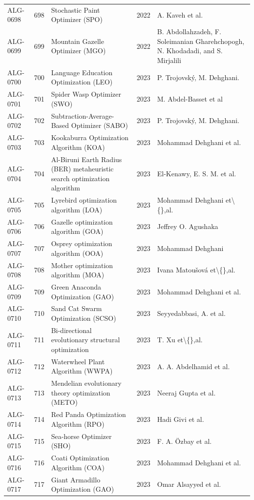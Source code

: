 \documentclass[8pt]{article}
\begin{document}
\begin{landscape}
\begin{longtable}{P{1.7cm}rP{10.0cm}rP{7.2cm}}
ALG-0698 & 698 & Stochastic Paint Optimizer (SPO) & 2022 & A. Kaveh et al. \\
ALG-0699 & 699 & Mountain Gazelle Optimizer (MGO) & 2022 & B. Abdollahzadeh, F. Soleimanian Gharehchopogh, N. Khodadadi, and S. Mirjalili \\
ALG-0700 & 700 & Language Education Optimization (LEO) & 2023 & P. Trojovský, M. Dehghani. \\
ALG-0701 & 701 & Spider Wasp Optimizer (SWO) & 2023 & M. Abdel-Basset et al \\
ALG-0702 & 702 & Subtraction-Average-Based Optimizer (SABO) & 2023 & P. Trojovský, M. Dehghani. \\
ALG-0703 & 703 & Kookaburra Optimization Algorithm (KOA) & 2023 & Mohammad Dehghani et al. \\
ALG-0704 & 704 & Al-Biruni Earth Radius (BER) metaheuristic search optimization algorithm & 2023 & El-Kenawy, E. S. M. et al. \\
ALG-0705 & 705 & Lyrebird optimization algorithm (LOA) & 2023 & Mohammad Dehghani et\textbackslash\{\},al. \\
ALG-0706 & 706 & Gazelle optimization algorithm (GOA) & 2023 & Jeffrey O. Agushaka \\
ALG-0707 & 707 & Osprey optimization algorithm (OOA) & 2023 & Mohammad Dehghani \\
ALG-0708 & 708 & Mother optimization algorithm (MOA) & 2023 & Ivana Matoušová et\textbackslash\{\},al. \\
ALG-0709 & 709 & Green Anaconda Optimization (GAO) & 2023 & Mohammad Dehghani et al. \\
ALG-0710 & 710 & Sand Cat Swarm Optimization (SCSO) & 2023 & Seyyedabbasi, A. et al. \\
ALG-0711 & 711 & Bi-directional evolutionary structural optimization & 2023 & T. Xu et\textbackslash\{\},al. \\
ALG-0712 & 712 & Waterwheel Plant Algorithm (WWPA) & 2023 & A. A. Abdelhamid et al. \\
ALG-0713 & 713 & Mendelian evolutionary theory optimization (METO) & 2023 & Neeraj Gupta et al. \\
ALG-0714 & 714 & Red Panda Optimization Algorithm (RPO) & 2023 & Hadi Givi et al. \\
ALG-0715 & 715 & Sea-horse Optimizer (SHO) & 2023 & F. A. Özbay et al. \\
ALG-0716 & 716 & Coati Optimization Algorithm (COA) & 2023 & Mohammad Dehghani et al. \\
ALG-0717 & 717 & Giant Armadillo Optimization (GAO) & 2023 & Omar Alsayyed et al. \\

\end{longtable}
\end{landscape}
\end{document}
